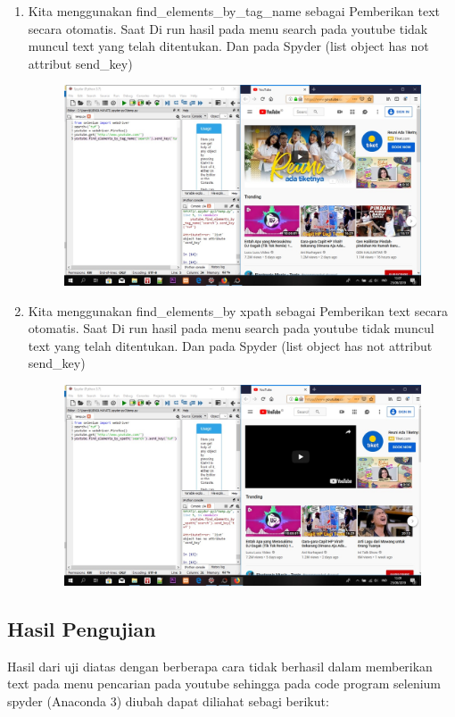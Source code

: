\begin{enumerate}
    \item Kita menggunakan find\_elements\_by\_tag\_name sebagai Pemberikan text secara otomatis. Saat  Di run hasil pada menu search pada youtube tidak muncul text yang telah ditentukan. Dan pada Spyder {(list object has not attribut send\_key)}
\begin{figure}[!htbp]
    \centering
    \includegraphics[scale=0.3]{figure/hasilTes/13.jpeg}
    \label{gambar 1}
\end{figure}

    \item Kita menggunakan find\_elements\_by xpath sebagai Pemberikan text secara otomatis. Saat  Di run hasil pada menu search pada youtube tidak muncul text yang telah ditentukan. Dan pada Spyder {(list object has not attribut send\_key)}
\begin{figure}[!htbp]
    \centering
    \includegraphics[scale=0.3]{figure/hasilTes/14.jpeg}
    \label{gambar 1}
\end{figure}
\end{enumerate}

\subsection{Hasil Pengujian}
Hasil dari uji diatas dengan berberapa cara tidak berhasil dalam memberikan text pada menu pencarian pada youtube sehingga pada code program selenium spyder (Anaconda 3) diubah dapat diliahat sebagi berikut:

